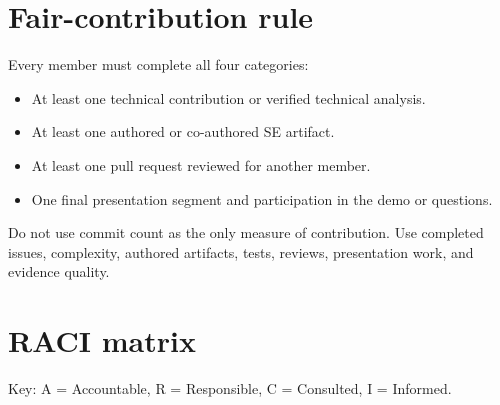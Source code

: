 \documentclass[
  10pt,
  a4paper,
  oneside]{report}
\providecommand{\tightlist}{%
  \setlength{\itemsep}{0pt}\setlength{\parskip}{0pt}}
\begin{document}
\section{Fair-contribution rule}\label{72-fair-contribution-rule}

Every member must complete all four categories:

\begin{itemize}
\tightlist
\item
  At least one technical contribution or verified technical analysis.
\item
  At least one authored or co-authored SE artifact.
\item
  At least one pull request reviewed for another member.
\item
  One final presentation segment and participation in the demo or
  questions.
\end{itemize}

Do not use commit count as the only measure of contribution. Use
completed issues, complexity, authored artifacts, tests, reviews,
presentation work, and evidence quality.

\section{RACI matrix}\label{73-raci-matrix}

Key: A = Accountable, R = Responsible, C = Consulted, I = Informed.
\end{document}
